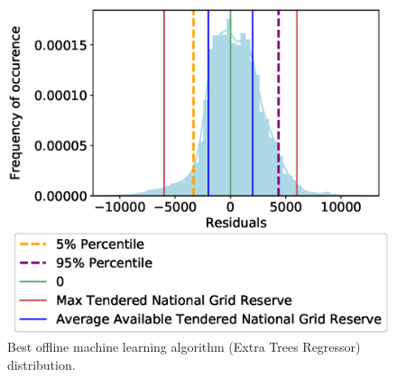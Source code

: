 \begin{figure}[h]
\centering
\includegraphics[width=\columnwidth]{Chapter5/figures/market-forecasting/results/ExtraTreesRegressor_distribution_plot.eps}
\caption{Best offline machine learning algorithm (Extra Trees Regressor) distribution.}
\label{fig:best_offline_learning_day_distribution}
\end{figure}




%
%


